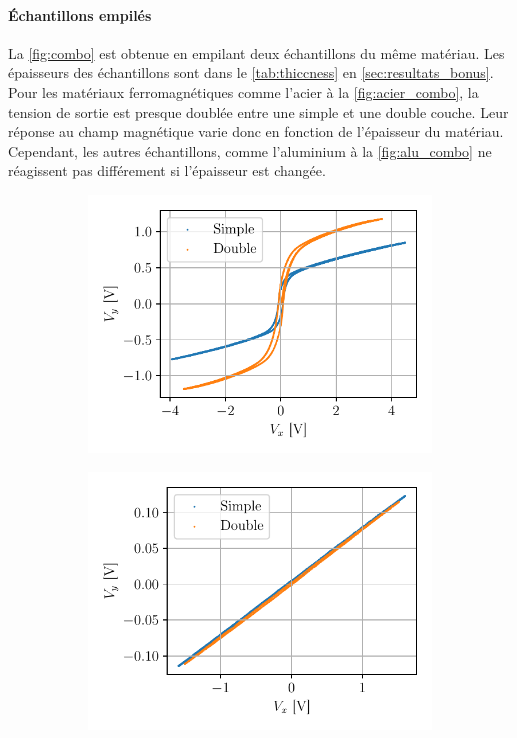 \paragraph{Échantillons empilés}
La \autoref{fig:combo} est obtenue en empilant deux échantillons du même matériau. Les épaisseurs des échantillons sont dans le \autoref{tab:thiccness} en \autoref{sec:resultats_bonus}. Pour les matériaux ferromagnétiques comme l'acier à la \autoref{fig:acier_combo}, la tension de sortie est presque doublée entre une simple et une double couche. Leur réponse au champ magnétique varie donc en fonction de l'épaisseur du matériau. Cependant, les autres échantillons, comme l'aluminium à la \autoref{fig:alu_combo} ne réagissent pas différement si l'épaisseur est changée.

\begin{figure}[h]
    \centering
    \begin{subfigure}{0.5\linewidth}
        \centering
        \includegraphics[width=\linewidth]{figures/ac_doux_simple_vs_combo.pdf}
        \caption{}
        \label{fig:acier_combo}
    \end{subfigure}%
    \begin{subfigure}{0.5\linewidth}
        \centering
        \includegraphics[width=\linewidth]{figures/alu_simple_vs_combo.pdf}

\end{subfigure}
\end{figure}
